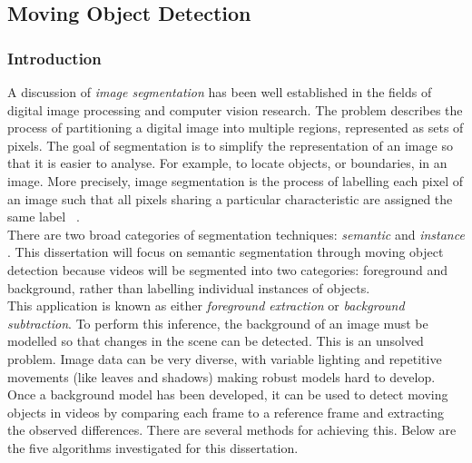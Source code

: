 \setlength{\leftskip}{0cm}




\subsection{Moving Object Detection}
\label{sec:movingObjectDetection}
\subsubsection{Introduction}
\setlength{\leftskip}{0.5cm}
\indent \indent
A discussion of \textit{image segmentation} has been well established in the fields of digital image processing and computer vision research. The problem describes the process of partitioning a digital image into multiple regions, represented as sets of pixels. The goal of segmentation is to simplify the representation of an image so that it is easier to analyse. For example, to locate objects, or boundaries, in an image. More precisely, image segmentation is the process of labelling each pixel of an image such that all pixels sharing a particular characteristic are assigned the same label ~\cite{Shapiro}.
\smallskip \\ \indent
There are two broad categories of segmentation techniques: \textit{semantic} \cite{Semantic} and \textit{instance} \cite{Instance}. This dissertation will focus on semantic segmentation through moving object detection because videos will be segmented into two categories: foreground and background, rather than labelling individual instances of objects.
\smallskip \\ \indent
This application is known as either \textit{foreground extraction} or \textit{background subtraction}. To perform this inference, the background of an image must be modelled so that changes in the scene can be detected. This is an unsolved problem. Image data can be very diverse, with variable lighting and repetitive movements (like leaves and shadows) making robust models hard to develop.
\smallskip \\ \indent
Once a background model has been developed, it can be used to detect moving objects in videos by comparing each frame to a reference frame and extracting the observed differences. There are several methods for achieving this. Below are the five algorithms investigated for this dissertation.

\setlength{\leftskip}{0cm}
